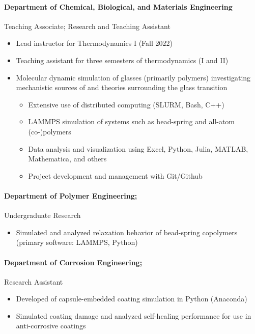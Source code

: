 \documentclass{my_cv}
\begin{document}
\paragraph{Department of Chemical, Biological, and Materials Engineering\\}
Teaching Associate; Research and Teaching Assistant
\begin{itemize}
    \item Lead instructor for Thermodynamics I (Fall 2022)
    \item Teaching assistant for three semesters of thermodynamics (I and II)
    \item Molecular dynamic simulation of glasses (primarily polymers) investigating mechanistic sources of and theories surrounding the glass transition
    \begin{itemize}
        \item Extensive use of distributed computing (SLURM, Bash, C++)
        \item LAMMPS simulation of systems such as bead-spring and all-atom (co-)polymers
        \item Data analysis and visualization using Excel, Python, Julia, MATLAB, Mathematica, and others
        \item Project development and management with Git/Github
    \end{itemize}
\end{itemize}

\paragraph{Department of Polymer Engineering;}
Undergraduate Research
\begin{itemize}
    \item Simulated and analyzed relaxation behavior of bead-spring co\-polymers (primary software: LAMMPS, Python)
\end{itemize}

\paragraph{Department of Corrosion Engineering;}
Research Assistant
\begin{itemize}
    \item Developed of capsule-embedded coating simulation in Python (Anaconda)
    \item Simulated coating damage and analyzed self-healing performance for use in anti-corrosive coatings
\end{itemize}
\end{document}
